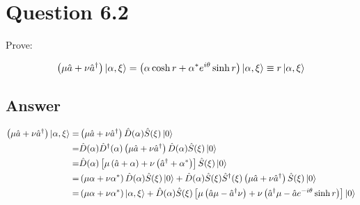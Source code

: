 \documentclass[twoside]{article}
\begin{document}
\clearpage

\section*{Question 6.2}
Prove:

\begin{equation*}
    \left(\mu \hat{a} + \nu \hat{a}^\dagger\right) \ket{\alpha, \xi} = \left(\alpha \cosh r + \alpha^* e^{i\theta} \sinh r\right) \ket{\alpha, \xi} \equiv r \ket{\alpha, \xi}
\end{equation*}


\subsection*{Answer}

\begin{equation*}
    \begin{split}
        \left(\mu \hat{a} + \nu \hat{a}^\dagger\right) \ket{\alpha, \xi} = &
        \left(\mu \hat{a} + \nu \hat{a}^\dagger\right) \hat{D} (\alpha) \hat{S} (\xi)\ket{0}                                                                                       \\
        =                                                                  &
        \hat{D} (\alpha) \hat{D}^\dagger (\alpha) \left(\mu \hat{a} + \nu \hat{a}^\dagger\right) \hat{D} (\alpha) \hat{S} (\xi)\ket{0}                                             \\
        =                                                                  &
        \hat{D} (\alpha) \left[\mu \left(\hat{a} + \alpha \right) + \nu \left(\hat{a}^\dagger + \alpha^* \right)\right] \hat{S} (\xi)\ket{0}                                       \\
        =                                                                  &
        \left(\mu \alpha + \nu \alpha^*\right) \hat{D} (\alpha)  \hat{S} (\xi)\ket{0} +
        \hat{D} (\alpha) \hat{S} (\xi) \hat{S}^\dagger (\xi)\left(\mu \hat{a} + \nu \hat{a}^\dagger \right) \hat{S} (\xi)\ket{0}                                                   \\
        =                                                                  &
        \left(\mu \alpha + \nu \alpha^*\right) \ket{\alpha, \xi} +
        \hat{D} (\alpha) \hat{S} (\xi) \left[\mu \left(\hat{a} \mu - \hat{a}^\dagger \nu\right) + \nu \left(\hat{a}^\dagger \mu - \hat{a}e^{-i\theta} \sinh r\right)\right]\ket{0} \\

\end{split}
\end{equation*}
\end{document}
